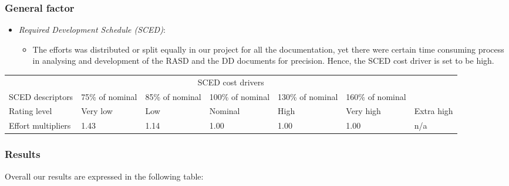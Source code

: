 \subsubsection{General factor}

\begin{itemize}
	\item \emph{Required Development Schedule (SCED)}:
	\begin{itemize}
		 \item[] The efforts was distributed or split equally in our project for all the documentation, yet there were certain time consuming process in analysing and development of the RASD and the DD documents for precision. Hence, the SCED cost driver is set to be high.
	\end{itemize}
\end{itemize}

\begin{table}[H]
	\hspace*{-1.7cm}
	\begin{tabular}{|p{2cm}|p{2cm}|p{2cm}|p{2cm}|p{2cm}|p{2cm}|p{2cm}|}
		\hline
		\multicolumn{7}{|c|}{SCED cost drivers} \\
		\hhline{|=======|}
		SCED descriptors & 75\% of nominal & 85\% of nominal & 100\% of nominal & 130\% of nominal & 160\% of nominal & \\
		\hline
		Rating level & Very low & Low & Nominal & High & Very high & Extra high \\
		\hline
		Effort multipliers & 1.43 & 1.14 & 1.00 & 1.00 & 1.00 & n/a \\
		\hline
	\end{tabular}
\end{table}

\subsubsection{Results}
Overall our results are expressed in the following table:

